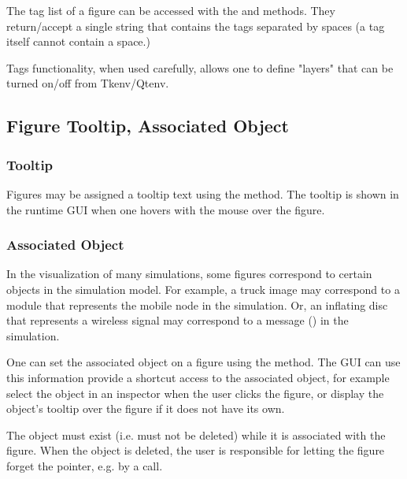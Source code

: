 The tag list of a figure can be accessed with the  and
  methods. They return/accept a single
string that contains the tags separated by spaces (a tag itself cannot
contain a space.)

Tags functionality, when used carefully, allows one to define "layers"
that can be turned on/off from Tkenv/Qtenv.



\subsection{Figure Tooltip, Associated Object}
\label{sec:graphics:figure-tooltip-associated-object}

\subsubsection{ Tooltip}
\label{sec:graphics:figure-tooltip}

Figures may be assigned a tooltip text using the  method. 
The tooltip is shown in the runtime GUI when one hovers with the mouse over the
figure.

\subsubsection{Associated Object}
\label{sec:graphics:figure-associated-object}

In the visualization of many simulations, some figures correspond to
certain objects in the simulation model. For example, a truck image
may correspond to a module that represents the mobile node
in the simulation. Or, an inflating disc that represents a wireless
signal may correspond to a message () in the simulation.

One can set the associated object on a figure using the 
 method. The GUI can use this information
provide a shortcut access to the associated object, for example select the
object in an inspector when the user clicks the figure, or display
the object's tooltip over the figure if it does not have its own.

\begin{caution}
The object must exist (i.e. must not be deleted) while it is
associated with the figure. When the object is deleted, the user
is responsible for letting  the figure forget the pointer,  
e.g. by a   call.
\end{caution} 
  

